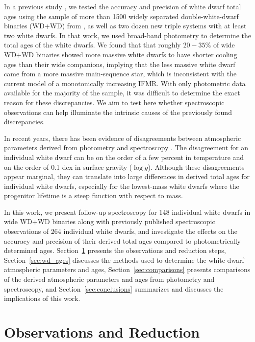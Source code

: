 \documentclass[twocolumn]{aastex631}
\newcommand{\logg}{$\log{g}$}
\begin{document}
In a previous study \citep{2022ApJ...934..148H}, we tested the accuracy and precision of white dwarf total ages using the sample of more than 1500 widely separated double-white-dwarf binaries (WD+WD) from \cite{2021MNRAS.506.2269E}, as well as two dozen new triple systems with at least two white dwarfs. In that work, we used broad-band photometry to determine the total ages of the white dwarfs. We found that that roughly $20-35$\% of wide WD+WD binaries showed more massive white dwarfs to have shorter cooling ages than their wide companions, implying that the less massive white dwarf came from a more massive main-sequence star, which is inconsistent with the current model of a monotonically increasing IFMR. With only photometric data available for the majority of the sample, it was difficult to determine the exact reason for these discrepancies. We aim to test here whether spectroscopic observations can help illuminate the intrinsic causes of the previously found discrepancies.

In recent years, there has been evidence of disagreements between atmospheric parameters derived from photometry and spectroscopy \citep{2019MNRAS.482.5222T, 2019ApJ...876...67B, 2021MNRAS.508.3877G, 2023MNRAS.518.3055O, 2023MNRAS.526.5800S}. The disagreement for an individual white dwarf can be on the order of a few percent in temperature and on the order of 0.1 dex in surface gravity (\logg). Although these disagreements appear marginal, they can translate into large differences in derived total ages for individual white dwarfs, especially for the lowest-mass white dwarfs where the progenitor lifetime is a steep function with respect to mass.

In this work, we present follow-up spectroscopy for 148 individual white dwarfs in wide WD+WD binaries along with previously published spectroscopic observations of 264 individual white dwarfs, and investigate the effects on the accuracy and precision of their derived total ages compared to photometrically determined ages. Section~\ref{sec:obs} presents the observations and reduction steps, Section~\ref{sec:wd_ages} discusses the methods used to determine the white dwarf atmospheric parameters and ages, Section~\ref{sec:comparisons} presents comparisons of the derived atmospheric parameters and ages from photometry and spectroscopy, and Section~\ref{sec:conclusions} summarizes and discusses the implications of this work.

\section{Observations and Reduction}\label{sec:obs}
\end{document}
